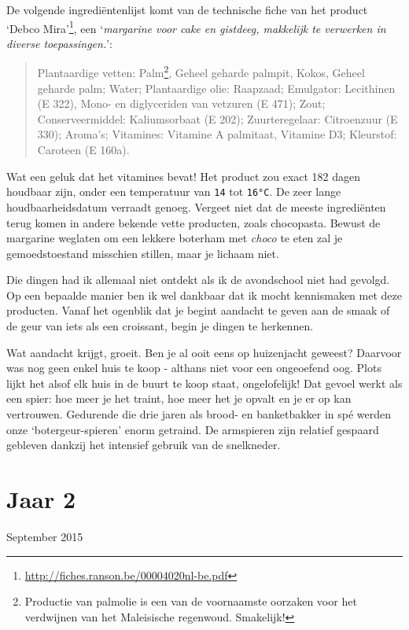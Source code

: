 \documentclass[
  11pt,
  dutch,
]{memoir}
\begin{document}
De volgende ingrediëntenlijst komt van de technische fiche van het
product `Debco Mira'\footnote{\url{http://fiches.ranson.be/00004020nl-be.pdf}},
een `\emph{margarine voor cake en gistdeeg, makkelijk te verwerken in
diverse toepassingen.}':

\begin{quote}
Plantaardige vetten: Palm\footnote{Productie van palmolie is een van de
  voornaamste oorzaken voor het verdwijnen van het Maleisische
  regenwoud. Smakelijk!}, Geheel geharde palmpit, Kokos, Geheel geharde
palm; Water; Plantaardige olie: Raapzaad; Emulgator: Lecithinen (E 322),
Mono- en diglyceriden van vetzuren (E 471); Zout; Conserveermiddel:
Kaliumsorbaat (E 202); Zuurteregelaar: Citroenzuur (E 330); Aroma's;
Vitamines: Vitamine A palmitaat, Vitamine D3; Kleurstof: Caroteen (E
160a).
\end{quote}

Wat een geluk dat het vitamines bevat! Het product zou exact 182 dagen
houdbaar zijn, onder een temperatuur van \texttt{14} tot \texttt{16°C}.
De zeer lange houdbaarheidsdatum verraadt genoeg. Vergeet niet dat de
meeste ingrediënten terug komen in andere bekende vette producten, zoals
chocopasta. Bewust de margarine weglaten om een lekkere boterham met
\emph{choco} te eten zal je gemoedstoestand misschien stillen, maar je
lichaam niet.

Die dingen had ik allemaal niet ontdekt als ik de avondschool niet had
gevolgd. Op een bepaalde manier ben ik wel dankbaar dat ik mocht
kennismaken met deze producten. Vanaf het ogenblik dat je begint
aandacht te geven aan de smaak of de geur van iets als een croissant,
begin je dingen te herkennen.

Wat aandacht krijgt, groeit. Ben je al ooit eens op huizenjacht geweest?
Daarvoor was nog geen enkel huis te koop - althans niet voor een
ongeoefend oog. Plots lijkt het alsof elk huis in de buurt te koop
staat, ongelofelijk! Dat gevoel werkt als een spier: hoe meer je het
traint, hoe meer het je opvalt en je er op kan vertrouwen. Gedurende die
drie jaren als brood- en banketbakker in spé werden onze
`botergeur-spieren' enorm getraind. De armspieren zijn relatief gespaard
gebleven dankzij het intensief gebruik van de snelkneder.

\hypertarget{jaar-2}{%
\section{Jaar 2}\label{jaar-2}}

\begin{flushright}
September 2015
\end{flushright}
\end{document}
